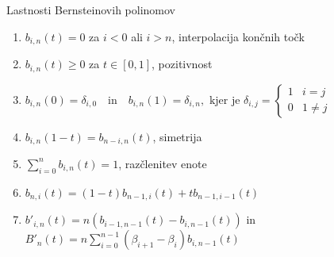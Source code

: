 \documentclass[isrm2, tisk]{fmfdelo}
\newcommand{\lilb}[2]{b_{#1,#2}(t)}
\newcommand{\bigbo}[1]{B'_{#1}(t)}
\newcommand{\bernsteinsumtridva}[2]{\sum_{#1=0}^{#2} \lilb{#1}{#2}}
\begin{document}
    \begin{izrek}{Lastnosti Bernsteinovih polinomov}
        \label{izrek:bernsteinovi_lastnosti}

        \begin{enumerate}
            \item $\lilb{i}{n} = 0$ za $i<0$ ali $i>n$, interpolacija končnih točk \label{izrek:bernsteinovi_lastnosti:interpolacija}
            \item $\lilb{i}{n} \geq 0$ za $t\in[0,1]$, pozitivnost \label{izrek:bernsteinovi_lastnosti:pozitivnost}
            \item $b_{i,n}(0) = \delta_{i,0} \quad \text{in} \quad  b_{i,n}(1) = \delta_{i,n}, \text{ kjer je }  \delta_{i,j} = \begin{cases}
                                                                                                                                    1 & i=j \\
                                                                                                                                    0 & 1\neq j
            \end{cases}$
            \item $b_{i,n}(1-t) = \lilb{n-i}{n}$, simetrija \label{izrek:bernsteinovi_lastnosti:simetrija}
            \item $\bernsteinsumtridva{i}{n} = 1$, razčlenitev enote \label{izrek:bernsteinovi_lastnosti:enota}
            \item $\lilb{n}{i} = (1-t)\lilb{n-1}{i} + t\lilb{n-1}{i-1}$ \label{izrek:bernsteinovi_lastnosti:rekruzija}
            \item $b'_{i,n}(t)=n(\lilb{i-1}{n-1} - \lilb{i}{n-1})$ in  $\bigbo{n}=n\sum^{n-1}_{i=0}(\beta_{i+1}-\beta_{i})b_{i,n-1}(t)$ \label{izrek:bernsteinovi_lastnosti:odvod}
        \end{enumerate}
    \end{izrek}
\end{document}
